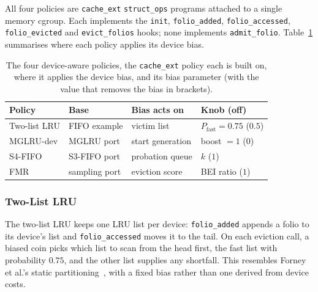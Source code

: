 \documentclass[11pt,sigconf,nonacm]{acmart}
\newcommand{\cacheExt}{\texttt{cache\_ext}}
\begin{document}

\label{sec:policies}

All four policies are \cacheExt{} \texttt{struct\_ops} programs attached to a single memory cgroup. Each implements the \texttt{init}, \texttt{folio\_added}, \texttt{folio\_accessed}, \texttt{folio\_evicted} and \texttt{evict\_folios} hooks; none implements \texttt{admit\_folio}. Table~\ref{tab:policies} summarises where each policy applies its device bias.

\begin{table}[t]
  \centering
  \footnotesize
  \setlength{\tabcolsep}{3pt}
  \begin{tabularx}{\columnwidth}{@{}l>{\raggedright\arraybackslash}X>{\raggedright\arraybackslash}Xl@{}}
    \toprule
    Policy & Base & Bias acts on & Knob (off) \\
    \midrule
    Two-list LRU & FIFO example & victim list & $P_\text{fast}=0.75$ ($0.5$) \\
    MGLRU-dev & MGLRU port & start generation & boost $=1$ ($0$) \\
    S4-FIFO & S3-FIFO port & probation queue & $k$ ($1$) \\
    FMR & sampling port & eviction score & BEI ratio ($1$) \\
    \bottomrule
  \end{tabularx}
  \caption{The four device-aware policies, the \cacheExt{} policy each is built on, where it applies the device bias, and its bias parameter (with the value that removes the bias in brackets). }
  \label{tab:policies}
\end{table}

\subsubsection{Two-List LRU}
\label{sec:two-list-lru}

The two-list LRU keeps one LRU list per device: \texttt{folio\_added} appends a folio to its device's list and \texttt{folio\_accessed} moves it to the tail. On each eviction call, a biased coin picks which list to scan from the head first, the fast list with probability $0.75$, and the other list supplies any shortfall. This resembles Forney et al.'s static partitioning~\cite{Forney}, with a fixed bias rather than one derived from device costs.
\end{document}
